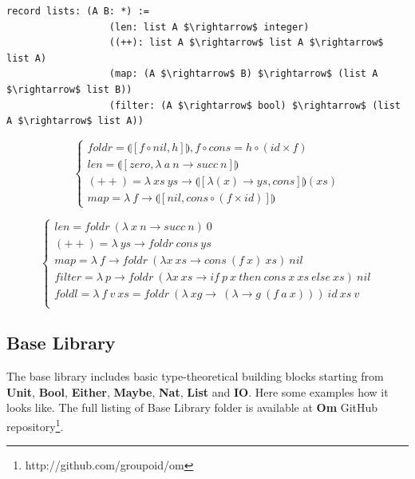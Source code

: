 \documentclass{aip-cp}
\begin{document}
\begin{lstlisting}[mathescape=true]
           record lists: (A B: *) :=
                  (len: list A $\rightarrow$ integer)
                  ((++): list A $\rightarrow$ list A $\rightarrow$ list A)
                  (map: (A $\rightarrow$ B) $\rightarrow$ (list A $\rightarrow$ list B))
                  (filter: (A $\rightarrow$ bool) $\rightarrow$ (list A $\rightarrow$ list A))
\end{lstlisting}

$$
\begin{cases}
foldr = \llparenthesis [ f \circ nil , h] \rrparenthesis, f \circ cons = h \circ (id \times f)\\
len = \llparenthesis [ zero, \lambda\ a\ n \rightarrow succ\ n ] \rrparenthesis \\
(++) = \lambda\ xs\ ys \rightarrow \llparenthesis [ \lambda (x) \rightarrow ys, cons ] \rrparenthesis (xs) \\
map = \lambda\ f \rightarrow \llparenthesis [ nil, cons \circ (f \times id)] \rrparenthesis
\end{cases}
$$

$$
\begin{cases}
len = foldr\ (\lambda\ x\ n \rightarrow succ\ n)\ 0\\
(++) = \lambda\ ys \rightarrow foldr\ cons\ ys\\
map = \lambda\ f \rightarrow foldr\ (\lambda x\ xs \rightarrow cons\ (f\ x)\ xs)\ nil\\
filter = \lambda\ p \rightarrow foldr\ (\lambda x\ xs \rightarrow if\ p\ x\ then\ cons\ x\ xs\ else\ xs)\ nil\\
foldl = \lambda\ f\ v\ xs = foldr\ (\lambda\ xg\rightarrow\ (\lambda \rightarrow g\ (f\ a\ x)))\ id\ xs\ v\\
\end{cases}
$$

\subsection{Base Library}
The base library includes basic type-theoretical
building blocks starting from {\bf Unit}, {\bf Bool}, {\bf Either}, {\bf Maybe}, {\bf Nat}, {\bf List} and {\bf IO}.
Here some examples how it looks like. The full listing of Base Library folder
is available at {\bf Om} GitHub repository\footnote{http://github.com/groupoid/om}.
\end{document}
